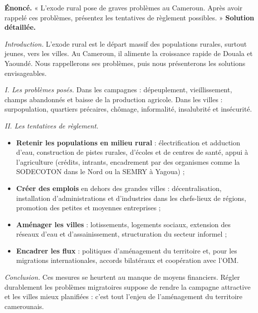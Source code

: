 \documentclass[11pt]{article}
\newcommand{\cle}[1]{{\popxbold\color{popdark}#1}}
\begin{document}
\begin{exoresolu}
\textbf{Énoncé.} « L'exode rural pose de graves problèmes au Cameroun. Après avoir rappelé ces problèmes, présentez les tentatives de règlement possibles. »
\tcblower
\textbf{Solution détaillée.}

\emph{Introduction.} L'\cle{exode rural} est le départ massif des populations rurales, surtout jeunes, vers les villes. Au Cameroun, il alimente la croissance rapide de Douala et Yaoundé. Nous rappellerons ses problèmes, puis nous présenterons les solutions envisageables.

\emph{I. Les problèmes posés.} Dans les campagnes : dépeuplement, vieillissement, champs abandonnés et baisse de la production agricole. Dans les villes : surpopulation, quartiers précaires, chômage, informalité, insalubrité et insécurité.

\emph{II. Les tentatives de règlement.}
\begin{itemize}
\item \textbf{Retenir les populations en milieu rural} : électrification et adduction d'eau, construction de pistes rurales, d'écoles et de centres de santé, appui à l'agriculture (crédits, intrants, encadrement par des organismes comme la SODECOTON dans le Nord ou la SEMRY à Yagoua) ;
\item \textbf{Créer des emplois} en dehors des grandes villes : décentralisation, installation d'administrations et d'industries dans les chefs-lieux de régions, promotion des petites et moyennes entreprises ;
\item \textbf{Aménager les villes} : lotissements, logements sociaux, extension des réseaux d'eau et d'assainissement, structuration du secteur informel ;
\item \textbf{Encadrer les flux} : politiques d'aménagement du territoire et, pour les migrations internationales, accords bilatéraux et coopération avec l'OIM.
\end{itemize}

\emph{Conclusion.} Ces mesures se heurtent au manque de moyens financiers. Régler durablement les problèmes migratoires suppose de rendre la campagne attractive et les villes mieux planifiées : c'est tout l'enjeu de l'aménagement du territoire camerounais.
\end{exoresolu}
\end{document}
